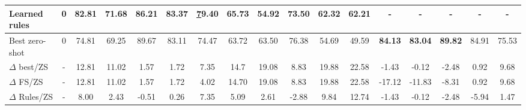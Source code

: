 \documentclass[sigconf,nonacm]{acmart}
\begin{document}
\begin{table*}[]
{\begin{tabular}{@{}l|c|ccccc|ccccc|ccccc@{}}
Learned rules                        & 0     & 82.81                        & 71.68                        & 86.21                        & 83.37                       & {\ul 79.40}                 & 65.73                        & 54.92                        & 73.50                        & 62.32                        & 62.21                        & -                             & -                             & -                            & -                            & \textbf{-}                  \\ \midrule
Best zero-shot                       & 0     & 74.81                        & 69.25                        & 89.67                        & 83.11                       & 74.47                       & 63.72                        & 63.50                        & 76.38                        & 54.69                        & 49.59                        & \textbf{84.13}                & \textbf{83.04}                & \textbf{89.82}               & 84.91                        & 75.53                       \\ \midrule
$\Delta$ best/ZS                        & -     & {\color[HTML]{6434FC} 12.81} & {\color[HTML]{6434FC} 11.02} & {\color[HTML]{6434FC} 1.57}  & {\color[HTML]{6434FC} 1.72} & {\color[HTML]{6434FC} 7.35} & {\color[HTML]{6434FC} 14.7}  & {\color[HTML]{6434FC} 19.08} & {\color[HTML]{6434FC} 8.83}  & {\color[HTML]{6434FC} 19.88} & {\color[HTML]{6434FC} 22.58} & {\color[HTML]{FE0000} -1.43}  & {\color[HTML]{FE0000} -0.12}  & {\color[HTML]{FE0000} -2.48} & {\color[HTML]{6434FC} 0.92}  & {\color[HTML]{6434FC} 9.68} \\
$\Delta$ FS/ZS                          & -     & {\color[HTML]{6434FC} 12.81} & {\color[HTML]{6434FC} 11.02} & {\color[HTML]{6434FC} 1.57}  & {\color[HTML]{6434FC} 1.72} & {\color[HTML]{6434FC} 4.02} & {\color[HTML]{6434FC} 14.70} & {\color[HTML]{6434FC} 19.08} & {\color[HTML]{6434FC} 8.83}  & {\color[HTML]{6434FC} 19.88} & {\color[HTML]{6434FC} 22.58} & {\color[HTML]{FE0000} -17.12} & {\color[HTML]{FE0000} -11.83} & {\color[HTML]{FE0000} -8.31} & {\color[HTML]{6434FC} 0.92}  & {\color[HTML]{6434FC} 9.68} \\
$\Delta$ Rules/ZS                       & -     & {\color[HTML]{6434FC} 8.00}  & {\color[HTML]{6434FC} 2.43}  & {\color[HTML]{FE0000} -0.51} & {\color[HTML]{6434FC} 0.26} & {\color[HTML]{6434FC} 7.35} & {\color[HTML]{6434FC} 5.09}  & {\color[HTML]{6434FC} 2.61}  & {\color[HTML]{FE0000} -2.88} & {\color[HTML]{6434FC} 9.84}  & {\color[HTML]{6434FC} 12.74} & {\color[HTML]{FE0000} -1.43}  & {\color[HTML]{FE0000} -0.12}  & {\color[HTML]{FE0000} -2.48} & {\color[HTML]{FE0000} -5.94} & {\color[HTML]{6434FC} 1.47} \\ \bottomrule
\end{tabular}}
\end{table*} 
\end{document}
